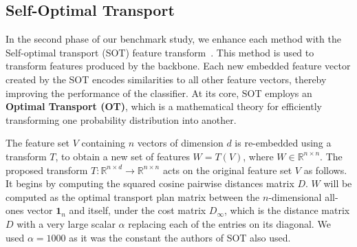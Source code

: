 \subsection{Self-Optimal Transport}


In the second phase of our benchmark study, we enhance each method with the Self-optimal transport (SOT) feature transform~\cite{sot}. This method is used to transform features produced by the backbone. Each new embedded feature vector created by the SOT encodes similarities to all other feature vectors, thereby improving the performance of the classifier.  At its core, SOT employs an \textbf{Optimal Transport (OT)}, which is a mathematical theory for efficiently transforming one probability distribution into another. 

The feature set $V$ containing $n$ vectors of dimension $d$ is re-embedded using a transform $T$, to obtain a new set of features $W = T(V)$, where $W \in \mathbb{R}^{n \times n}$. The proposed transform $T: \mathbb{R}^{n \times d} \rightarrow \mathbb{R}^{n \times n}$ acts on the original feature set \( V \) as follows. It begins by computing the squared cosine pairwise distances matrix $D$. $W$ will be computed as the optimal transport plan matrix between the $n$-dimensional all-ones vector $\mathbf{1}_n$ and itself, under the cost matrix $D_{\infty}$, which is the distance matrix $D$  with a very large scalar $\alpha$ replacing each of the entries on its diagonal. We used $\alpha=1000$ as it was the constant the authors of SOT also used.

